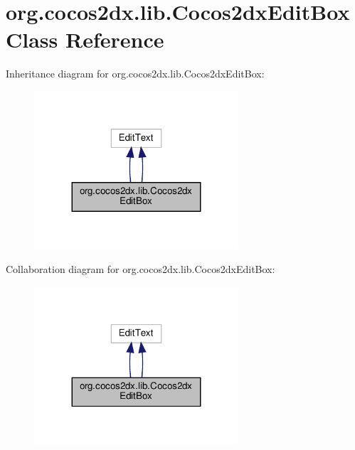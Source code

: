 \hypertarget{classorg_1_1cocos2dx_1_1lib_1_1Cocos2dxEditBox}{}\section{org.\+cocos2dx.\+lib.\+Cocos2dx\+Edit\+Box Class Reference}
\label{classorg_1_1cocos2dx_1_1lib_1_1Cocos2dxEditBox}


Inheritance diagram for org.\+cocos2dx.\+lib.\+Cocos2dx\+Edit\+Box\+:
\nopagebreak
\begin{figure}[H]
\begin{center}
\leavevmode
\includegraphics[width=215pt]{classorg_1_1cocos2dx_1_1lib_1_1Cocos2dxEditBox__inherit__graph}
\end{center}
\end{figure}


Collaboration diagram for org.\+cocos2dx.\+lib.\+Cocos2dx\+Edit\+Box\+:
\nopagebreak
\begin{figure}[H]
\begin{center}
\leavevmode
\includegraphics[width=215pt]{classorg_1_1cocos2dx_1_1lib_1_1Cocos2dxEditBox__coll__graph}
\end{center}
\end{figure}
